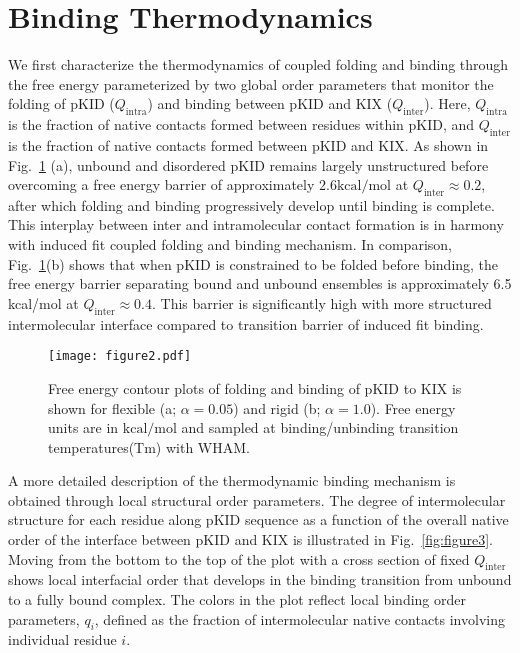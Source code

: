 \documentclass[../talant.diss.submit.tex]{subfiles}
\begin{document}
\section{\textbf{Binding Thermodynamics}}\label{sect:three_twoo}
%
%
We first characterize the thermodynamics of coupled folding and binding through
the free energy parameterized by two global order parameters that monitor the
folding of pKID ($Q_\mathrm{intra}$) and binding between pKID and KIX
($Q_\mathrm{inter}$). Here, $Q_\mathrm{intra}$ is the fraction of native
contacts formed between residues within pKID, and $Q_{\mathrm{inter}}$ is the
fraction of native contacts formed between pKID and KIX. As shown in
Fig.~\ref{fig:figure2} (a), unbound and disordered pKID remains
largely unstructured before overcoming a free energy barrier of approximately
$2.6\mathrm{kcal/mol}$ at $Q_\mathrm{inter} \approx 0.2$, after which folding
and binding progressively develop until binding is complete.  This interplay
between inter and intramolecular contact formation is in harmony with induced
fit coupled folding and binding mechanism.  In comparison,
Fig.~\ref{fig:figure2}(b) shows that when pKID is constrained to be folded
before binding, the free energy barrier separating bound and unbound ensembles
is approximately 6.5 kcal/mol at $Q_\mathrm{inter}\approx 0.4$. This barrier is
significantly high with more structured intermolecular interface compared to
transition barrier of induced fit binding.

\begin{figure}[h!]
  \centering
  \texttt{[image: figure2.pdf]}
  \caption{Free energy contour plots of folding and binding of pKID to KIX is
    shown for flexible (a; $\alpha=0.05$) and rigid (b; $\alpha=1.0$).  Free
    energy units are in $\mathrm{kcal/mol}$ and sampled at binding/unbinding
    transition temperatures(Tm) with WHAM.}
  \label{fig:figure2}
\end{figure}

A more detailed description of the thermodynamic binding mechanism is obtained
through local structural order parameters.  The degree of intermolecular
structure for each residue along pKID sequence as a function of the overall
native order of the interface between pKID and KIX is illustrated in
Fig.~\ref{fig:figure3}.  Moving from the bottom to the top of the plot with a
cross section of fixed $Q_{\mathrm{inter}}$ shows local interfacial order that
develops in the binding transition from unbound to a fully bound complex. The
colors in the plot reflect local binding order parameters, $q_{i}$,
defined as the fraction of intermolecular native contacts involving individual
residue $i$.
\end{document}
